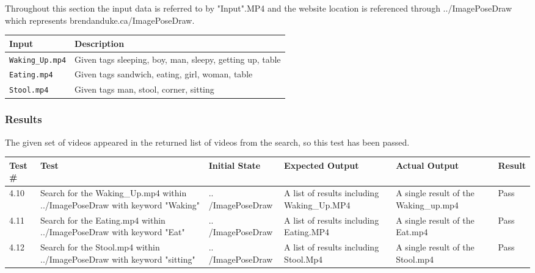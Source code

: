 \documentclass{scrreprt}
\begin{document}
Throughout this section the input data is referred to by "Input".MP4 and the website location is referenced through ../ImagePoseDraw which represents brendanduke.ca/ImagePoseDraw.

\begin{table}[H]
        \centering
        \begin{tabular}{p{3cm}p{6cm}}
                \hline\hline
                Input & Description\\
                \hline\hline
                \verb|Waking_Up.mp4| &  Given tags sleeping, boy, man, sleepy, getting up, table\\
                \hline
                \verb|Eating.mp4| &  Given tags sandwich, eating, girl, woman, table\\
                \hline
                \verb|Stool.mp4| &  Given tags man, stool, corner, sitting\\
                \hline
        \end{tabular}
\end{table}

\subsubsection{Results}

The given set of videos appeared in the returned list of videos from the search, so this test has been passed.

\begin{table}[H]
        \centering
        \begin{tabular}[t]{||p{0.75cm}|p{4cm}|p{2.5cm}|p{3cm}|p{2.5cm}|p{0.75cm}||}
                \hline
                \textbf Test \# & \textbf Test & \textbf Initial State & \textbf Expected Output & \textbf Actual Output & \textbf Result\\
                \hline\hline
                4.10 & Search for the Waking_Up.mp4 within ../ImagePoseDraw with keyword "Waking" & .. /ImagePoseDraw & A list of results including Waking_Up.MP4 & A single result of the Waking_up.mp4 & Pass\\
                \hline
                4.11 & Search for the Eating.mp4 within ../ImagePoseDraw with keyword "Eat" & .. /ImagePoseDraw & A list of results including Eating.MP4 & A single result of the Eat.mp4 & Pass\\
                \hline
                4.12 & Search for the Stool.mp4 within ../ImagePoseDraw with keyword "sitting" & .. /ImagePoseDraw & A list of results including Stool.Mp4 & A single result of the Stool.mp4 & Pass\\
                \hline
        \end{tabular}
\end{table}
\end{document}
